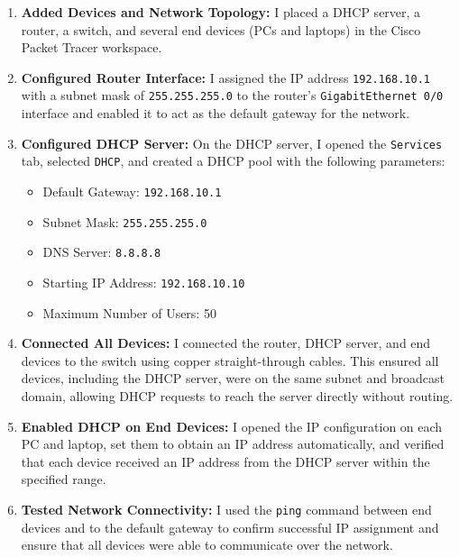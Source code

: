 \documentclass[11pt,a4paper]{article}
\let\oldincludegraphics\includegraphics
\renewcommand{\includegraphics}[2][]{%
  \begin{center}
    \oldincludegraphics[#1]{#2}
  \end{center}
}
\begin{document}
\begin{enumerate}
\item \textbf{Added Devices and Network Topology:} I placed a DHCP server, a router, a switch, and several end devices (PCs and laptops) in the Cisco Packet Tracer workspace.


\item \textbf{Configured Router Interface:} I assigned the IP address \texttt{192.168.10.1} with a subnet mask of \texttt{255.255.255.0} to the router’s \texttt{GigabitEthernet 0/0} interface and enabled it to act as the default gateway for the network.


\item \textbf{Configured DHCP Server:} On the DHCP server, I opened the \texttt{Services} tab, selected \texttt{DHCP}, and created a DHCP pool with the following parameters:
\begin{itemize}
  \item Default Gateway: \texttt{192.168.10.1}
  \item Subnet Mask: \texttt{255.255.255.0}
  \item DNS Server: \texttt{8.8.8.8}
  \item Starting IP Address: \texttt{192.168.10.10}
  \item Maximum Number of Users: 50
\end{itemize}


\item \textbf{Connected All Devices:} I connected the router, DHCP server, and end devices to the switch using copper straight-through cables. This ensured all devices, including the DHCP server, were on the same subnet and broadcast domain, allowing DHCP requests to reach the server directly without routing.


\item \textbf{Enabled DHCP on End Devices:} I opened the IP configuration on each PC and laptop, set them to obtain an IP address automatically, and verified that each device received an IP address from the DHCP server within the specified range.


\item \textbf{Tested Network Connectivity:} I used the \texttt{ping} command between end devices and to the default gateway to confirm successful IP assignment and ensure that all devices were able to communicate over the network.

\end{enumerate}
\end{document}
